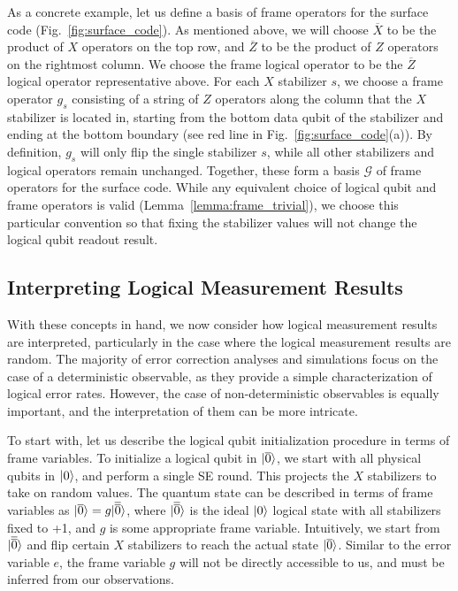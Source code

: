 As a concrete example, let us define a basis of frame operators for the surface code (Fig.~\ref{fig:surface_code}).
%
As mentioned above, we will choose $\overline{X}$ to be the product of $X$ operators on the top row, and $\overline{Z}$ to be the product of $Z$ operators on the rightmost column.
%
We choose the frame logical operator to be the $\overline{Z}$ logical operator representative above.
%
For each $X$ stabilizer $s$, we choose a frame operator $g_s$ consisting of a string of $Z$ operators along the column that the $X$ stabilizer is located in, starting from the bottom data qubit of the stabilizer and ending at the bottom boundary (see red line in Fig.~\ref{fig:surface_code}(a)).
%
By definition, $g_s$ will only flip the single stabilizer $s$, while all other stabilizers and logical operators remain unchanged.
%
Together, these form a basis $\mathcal{G}$ of frame operators for the surface code.
%
While any equivalent choice of logical qubit and frame operators is valid (Lemma~\ref{lemma:frame_trivial}), we choose this particular convention so that fixing the stabilizer values will not change the logical qubit readout result.

\subsection{Interpreting Logical Measurement Results}

With these concepts in hand, we now consider how logical measurement results are interpreted, particularly in the case where the logical measurement results are random.
%
The majority of error correction analyses and simulations focus on the case of a deterministic observable, as they provide a simple characterization of logical error rates.
%
However, the case of non-deterministic observables is equally important, and the interpretation of them can be more intricate.

To start with, let us describe the logical qubit initialization procedure in terms of frame variables.
%
To initialize a logical qubit in $|{\overline{0}}\rangle$, we start with all physical qubits in $\ket{0}$, and perform a single SE round.
%
This projects the $X$ stabilizers to take on random values.
%
The quantum state can be described in terms of frame variables as $|{\overline{0}}\rangle=g|\overline{\overline{0}}\rangle$, where $|\overline{\overline{0}}\rangle$ is the ideal $\ket{0}$ logical state with all stabilizers fixed to +1, and $g$ is some appropriate frame variable.
%
Intuitively, we start from $|\overline{\overline{0}}\rangle$ and flip certain $X$ stabilizers to reach the actual state $|{\overline{0}}\rangle$.
%
Similar to the error variable $e$, the frame variable $g$ will not be directly accessible to us, and must be inferred from our observations.

